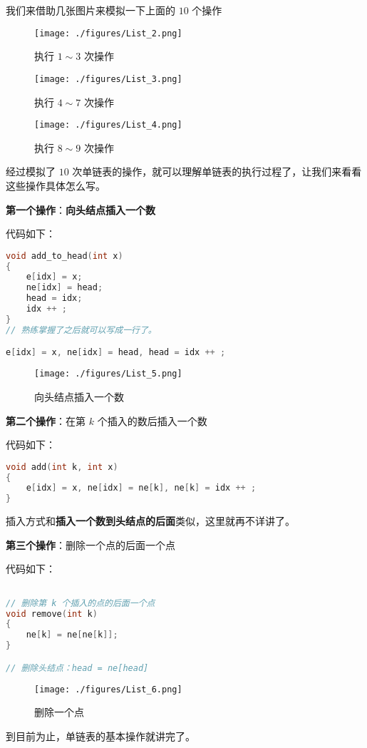 我们来借助几张图片来模拟一下上面的 $10$ 个操作

\begin{figure}[ht]
\centering
\texttt{[image: ./figures/List\_2.png]}
\caption{执行 $1\sim3$ 次操作} \label{List_fig2}
\end{figure}

\begin{figure}[ht]
\centering
\texttt{[image: ./figures/List\_3.png]}
\caption{执行 $4\sim7$ 次操作} \label{List_fig3}
\end{figure}

\begin{figure}[ht]
\centering
\texttt{[image: ./figures/List\_4.png]}
\caption{执行 $8\sim9$ 次操作} \label{List_fig4}
\end{figure}

经过模拟了 $10$ 次单链表的操作，就可以理解单链表的执行过程了，让我们来看看这些操作具体怎么写。

\textbf{第一个操作}：\textbf{向头结点插入一个数}

代码如下：

\begin{lstlisting}[language=cpp]
void add_to_head(int x) 
{
    e[idx] = x;
    ne[idx] = head;
    head = idx;
    idx ++ ;
}
// 熟练掌握了之后就可以写成一行了。

e[idx] = x, ne[idx] = head, head = idx ++ ;
\end{lstlisting}

\begin{figure}[ht]
\centering
\texttt{[image: ./figures/List\_5.png]}
\caption{向头结点插入一个数} \label{List_fig5}
\end{figure}



\textbf{第二个操作}：在第 $k$ 个插入的数后插入一个数


代码如下：

\begin{lstlisting}[language=cpp]
void add(int k, int x)
{
    e[idx] = x, ne[idx] = ne[k], ne[k] = idx ++ ;
}
\end{lstlisting}

插入方式和\textbf{插入一个数到头结点的后面}类似，这里就再不详讲了。

\textbf{第三个操作}：删除一个点的后面一个点

代码如下：

\begin{lstlisting}[language=cpp]

// 删除第 k 个插入的点的后面一个点
void remove(int k)
{
    ne[k] = ne[ne[k]];
}

// 删除头结点：head = ne[head]
\end{lstlisting}

\begin{figure}[ht]
\centering
\texttt{[image: ./figures/List\_6.png]}
\caption{删除一个点} \label{List_fig6}
\end{figure}

到目前为止，单链表的基本操作就讲完了。